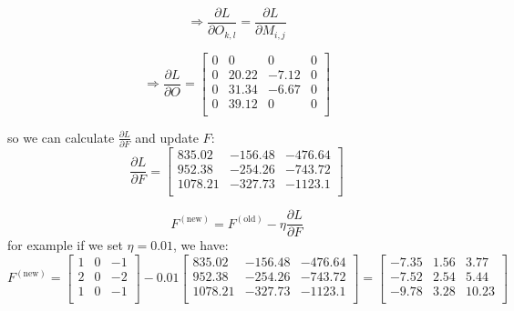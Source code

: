 \begin{qsolve}
\begin{qsolve}[]
        \[
        \Rightarrow \frac{\partial L}{\partial O_{k,l}} = \frac{\partial L}{\partial M_{i,j}}
        \]

        \[
        \Rightarrow \frac{\partial L}{\partial O} = \begin{bmatrix}
        0 & 0 & 0 & 0 \\
        0 & 20.22 & -7.12 & 0 \\
        0 & 31.34 & -6.67 & 0 \\
        0 & 39.12 & 0 & 0 \\
        \end{bmatrix}
        \]

        so we can calculate \(\frac{\partial L}{\partial F}\) and update \(F\):
        \[
        \frac{\partial L}{\partial F} = \begin{bmatrix}
        835.02 & -156.48 & -476.64 \\
        952.38 & -254.26 & -743.72 \\
        1078.21 & -327.73 & -1123.1 \\
        \end{bmatrix}
        \]

        \[
        F^{(\text{new})} = F^{(\text{old})} - \eta \frac{\partial L}{\partial F}
        \]   
        for example if we set \(\eta = 0.01\), we have:
        \[
        F^{(\text{new})} = \begin{bmatrix}
        1 & 0 & -1 \\
        2 & 0 & -2 \\
        1 & 0 & -1 \\
        \end{bmatrix} - 0.01 \begin{bmatrix}
        835.02 & -156.48 & -476.64 \\
        952.38 & -254.26 & -743.72 \\
        1078.21 & -327.73 & -1123.1 \\
        \end{bmatrix}
        = \begin{bmatrix}
            -7.35 & 1.56 & 3.77 \\
            -7.52 & 2.54 & 5.44 \\
            -9.78 & 3.28 & 10.23 \\
        \end{bmatrix}
        \]
    \end{qsolve}
\end{qsolve}